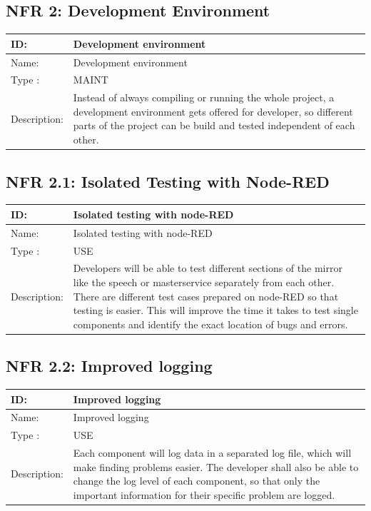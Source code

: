 \documentclass[12pt]{article}
\theoremstyle{definition}
\begin{document}
\subsection{NFR 2: Development Environment}
\begin{tabular}{|p{.2\linewidth}|p{.65\linewidth}|}
\hline 
ID: & Development environment \\ \hline
Name: & Development environment \\ \hline
Type	: & MAINT\\ \hline
Description: & Instead of always compiling or running the whole project, a development environment gets offered for developer, so different parts of the project can be build and tested independent of each other.\\ \hline
\end{tabular}

\subsection{NFR 2.1: Isolated Testing with Node-RED}
\begin{tabular}{|p{.2\linewidth}|p{.65\linewidth}|}
\hline 
ID: & Isolated testing with node-RED \\ \hline
Name: & Isolated testing with node-RED \\ \hline
Type	: & USE\\ \hline
Description: &  Developers will be able to test different sections of the mirror like the speech or masterservice separately from each other. There are different test cases prepared on node-RED so that testing is easier. This will improve the time it takes to test single components and identify the exact location of bugs and errors. \\ \hline
\end{tabular}

\subsection{NFR 2.2: Improved logging}
\begin{tabular}{|p{.2\linewidth}|p{.65\linewidth}|}
\hline
ID: & Improved logging \\ \hline
Name: & Improved logging \\ \hline
Type	: & USE\\ \hline
Description: &  Each component will log data in a separated log file, which will make finding problems easier. The developer shall also be able to change the log level of each component, so that only the important information for their specific problem are logged.\\ \hline
\end{tabular}
\end{document}
